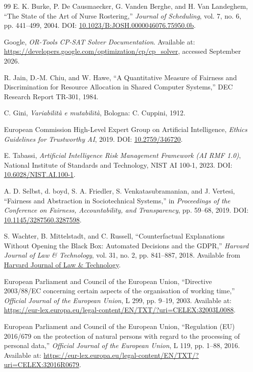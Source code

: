 \documentclass[11pt,a4paper]{article}
\begin{document}
\begin{thebibliography}{99}
E. K. Burke, P. De Causmaecker, G. Vanden Berghe, and H. Van Landeghem, ``The State of the Art of Nurse Rostering,'' \emph{Journal of Scheduling}, vol. 7, no. 6, pp. 441--499, 2004. DOI: \href{https://doi.org/10.1023/B:JOSH.0000046076.75950.0b}{10.1023/B:JOSH.0000046076.75950.0b}.

Google, \emph{OR-Tools CP-SAT Solver Documentation}. Available at: \url{https://developers.google.com/optimization/cp/cp_solver}, accessed September 2026.

R. Jain, D.-M. Chiu, and W. Hawe, ``A Quantitative Measure of Fairness and Discrimination for Resource Allocation in Shared Computer Systems,'' DEC Research Report TR-301, 1984.

C. Gini, \emph{Variabilit\`a e mutabilit\`a}, Bologna: C. Cuppini, 1912.

European Commission High-Level Expert Group on Artificial Intelligence, \emph{Ethics Guidelines for Trustworthy AI}, 2019. DOI: \href{https://doi.org/10.2759/346720}{10.2759/346720}.

E. Tabassi, \emph{Artificial Intelligence Risk Management Framework (AI RMF 1.0)}, National Institute of Standards and Technology, NIST AI 100-1, 2023. DOI: \href{https://doi.org/10.6028/NIST.AI.100-1}{10.6028/NIST.AI.100-1}.

A. D. Selbst, d. boyd, S. A. Friedler, S. Venkatasubramanian, and J. Vertesi, ``Fairness and Abstraction in Sociotechnical Systems,'' in \emph{Proceedings of the Conference on Fairness, Accountability, and Transparency}, pp. 59--68, 2019. DOI: \href{https://doi.org/10.1145/3287560.3287598}{10.1145/3287560.3287598}.

S. Wachter, B. Mittelstadt, and C. Russell, ``Counterfactual Explanations Without Opening the Black Box: Automated Decisions and the GDPR,'' \emph{Harvard Journal of Law \& Technology}, vol. 31, no. 2, pp. 841--887, 2018. Available from \href{https://jolt.law.harvard.edu/assets/articlePDFs/v31/Counterfactual-Explanations-without-Opening-the-Black-Box-Sandra-Wachter-et-al.pdf}{Harvard Journal of Law \& Technology}.

European Parliament and Council of the European Union, ``Directive 2003/88/EC concerning certain aspects of the organisation of working time,'' \emph{Official Journal of the European Union}, L 299, pp. 9--19, 2003. Available at: \url{https://eur-lex.europa.eu/legal-content/EN/TXT/?uri=CELEX:32003L0088}.

European Parliament and Council of the European Union, ``Regulation (EU) 2016/679 on the protection of natural persons with regard to the processing of personal data,'' \emph{Official Journal of the European Union}, L 119, pp. 1--88, 2016. Available at: \url{https://eur-lex.europa.eu/legal-content/EN/TXT/?uri=CELEX:32016R0679}.
\end{thebibliography}
\end{document}
